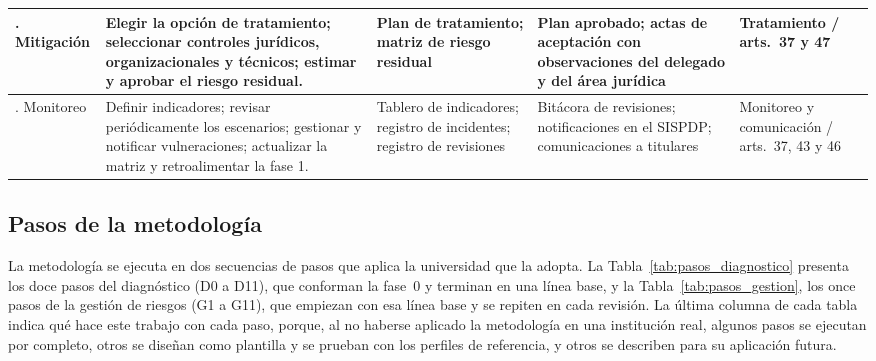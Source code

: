\begin{table}[htbp]
\begin{tabularx}{\textwidth}{|>{\raggedright\arraybackslash}p{1.7cm}|L|>{\raggedright\arraybackslash}p{2.6cm}|>{\raggedright\arraybackslash}p{2.6cm}|>{\raggedright\arraybackslash}p{2.0cm}|}
    . Mitigación & Elegir la opción de tratamiento; seleccionar controles jurídicos, organizacionales y técnicos; estimar y aprobar el riesgo residual. & Plan de tratamiento; matriz de riesgo residual & Plan aprobado; actas de aceptación con observaciones del delegado y del área jurídica & Tratamiento / arts.~37 y 47 \\
    . Monitoreo & Definir indicadores; revisar periódicamente los escenarios; gestionar y notificar vulneraciones; actualizar la matriz y retroalimentar la fase 1. & Tablero de indicadores; registro de incidentes; registro de revisiones & Bitácora de revisiones; notificaciones en el SISPDP; comunicaciones a titulares & Monitoreo y comunicación / arts.~37, 43 y 46 \\
    \hline
  \end{tabularx}
  \raggedright
\end{table}

\subsection{Pasos de la metodología}
\label{sec:pasos_metodologia}

La metodología se ejecuta en dos secuencias de pasos que aplica la universidad que la adopta. La Tabla~\ref{tab:pasos_diagnostico} presenta los doce pasos del diagnóstico (D0 a D11), que conforman la fase~0 y terminan en una línea base, y la Tabla~\ref{tab:pasos_gestion}, los once pasos de la gestión de riesgos (G1 a G11), que empiezan con esa línea base y se repiten en cada revisión. La última columna de cada tabla indica qué hace este trabajo con cada paso, porque, al no haberse aplicado la metodología en una institución real, algunos pasos se ejecutan por completo, otros se diseñan como plantilla y se prueban con los perfiles de referencia, y otros se describen para su aplicación futura.

